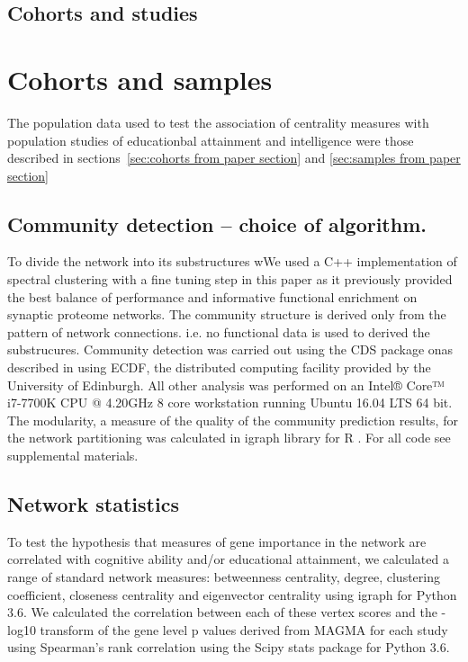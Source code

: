 \subsection{Cohorts and studies}
\section{Cohorts and samples}

The population data used to test the association of centrality measures with population studies of educationbal attainment and intelligence were those described in sections~\ref{sec:cohorts from paper section} and \ref{sec:samples from paper section}



\subsection{Community detection – choice of algorithm.} 
To divide the network into its substructures wWe used a C++ implementation of spectral clustering with a fine tuning step in this paper as it previously provided the best balance of performance and informative functional enrichment on synaptic proteome networks. \cite{mclean2016improved}  The community structure is derived only from the pattern of network connections. i.e. no functional data is used to derived the substrucures.
Community detection was carried out using the CDS package onas described in \cite{mclean2016improved} using ECDF, the distributed computing facility provided by the University of Edinburgh. All other analysis was performed on an Intel® Core™ i7-7700K CPU @ 4.20GHz 8 core workstation running Ubuntu 16.04 LTS 64 bit.  
The modularity, a measure of the quality of the community prediction results, for the network partitioning was calculated in igraph library for R \cite{csardi2006igraph} . For all code see supplemental materials. 

\subsection{Network statistics}
To test the hypothesis that measures of gene importance in the network are correlated with cognitive ability and/or educational attainment, we calculated a range of standard network measures: betweenness centrality, degree, clustering coefficient, closeness centrality and eigenvector centrality using igraph for Python 3.6. \cite{csardi2006igraph}  We calculated the correlation between each of these vertex scores and the -log10 transform of the gene level p values derived from MAGMA for each study using Spearman’s rank correlation using the Scipy stats package for Python 3.6. 
